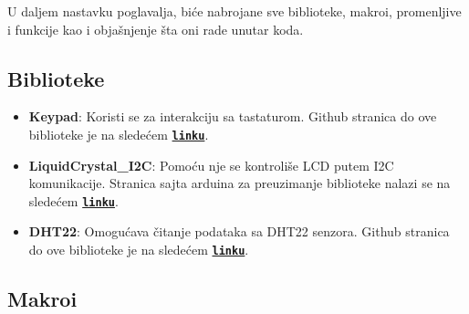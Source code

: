 \documentclass[a4paper, 12pt]{article}
\begin{document}
U daljem nastavku poglavalja, biće nabrojane sve biblioteke, makroi, promenljive i funkcije kao i objašnjenje šta oni rade unutar koda.
    
\vspace{10pt}

	\subsection{Biblioteke}
	\begin{itemize}
    		\item \textbf{Keypad}: Koristi se za interakciju sa tastaturom. Github stranica do ove biblioteke je na sledećem \textbf{\texttt{\href{https://github.com/Chris--A/Keypad.git}{linku}}}.
    		
    		\item \textbf{LiquidCrystal\_I2C}: Pomoću nje se kontroliše LCD putem I2C komunikacije. Stranica sajta arduina za preuzimanje biblioteke nalazi se na sledećem \textbf{\texttt{\href{https://downloads.arduino.cc/libraries/github.com/marcoschwartz/LiquidCrystal_I2C-1.1.2.zip}{linku}}}. 
    		
    		\item \textbf{DHT22}: Omogućava čitanje podataka sa DHT22 senzora. Github stranica do ove biblioteke je na sledećem \textbf{\texttt{\href{https://github.com/Chris--A/Keypad.git}{linku}}}.
	\end{itemize}

\newpage

	\subsection{Makroi}

\vspace{10pt}
\end{document}
